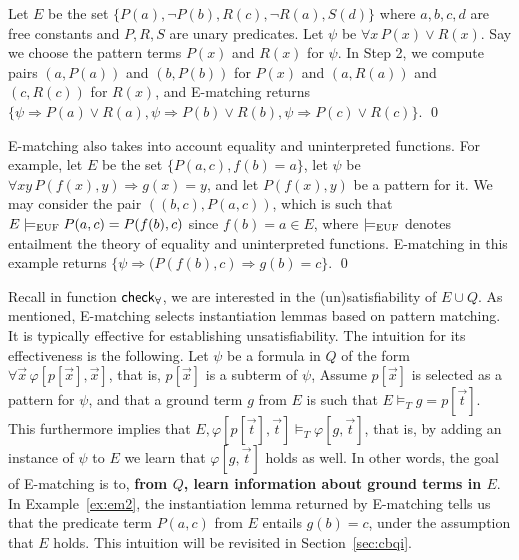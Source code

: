 \documentclass{easychair}
\begin{document}
\begin{example}
\label{ex:em2}
Let $E$ be the set $\{ P(a), \neg P(b), R(c), \neg R(a), S(d) \}$ where $a,b,c,d$ are free constants and $P,R,S$ are unary predicates.
Let $\psi$ be $\forall x\, P( x ) \vee R( x )$.
Say we choose the pattern terms $P( x )$ and $R( x )$ for $\psi$.
In Step 2, we compute pairs $( a, P( a ) )$ and $( b, P( b ) )$ for $P( x )$ and
$( a, R( a ) )$ and $( c, R( c ) )$ for $R( x )$,
and E-matching returns $\{
\psi \Rightarrow P( a ) \vee R( a ), \psi \Rightarrow P( b ) \vee R( b ), \psi \Rightarrow P( c ) \vee R( c )
\}$.
\qed
\end{example}

\begin{example}
\label{ex:em2}
E-matching also takes into account equality and uninterpreted functions.
For example, let $E$ be the set $\{ P( a, c ), f( b ) = a \}$,
let $\psi$ be $\forall xy\, P( f( x ), y ) \Rightarrow g( x ) = y$,
and let $P( f( x ), y )$ be a pattern for it.
We may consider the pair $( ( b, c ), P( a, c ) )$, which is such that $E \models_\mathrm{EUF} P( a, c ) = P( f( b ), c )$ since $f( b ) = a \in E$,
where $\models_\mathrm{EUF}$ denotes entailment the theory of equality and uninterpreted functions.
E-matching in this example returns $\{ \psi \Rightarrow ( P( f( b ), c ) \Rightarrow g( b ) = c \}$.
\qed
\end{example}

Recall in function $\small\mathsf{check}_\forall$, we are interested in the (un)satisfiability of $E \cup Q$.
As mentioned, E-matching selects instantiation lemmas based on pattern matching.
It is typically effective for establishing unsatisfiability.
The intuition for its effectiveness is the following. 
Let $\psi$ be a formula in $Q$ of the form $\forall \vec x\, \varphi[ p[ \vec x ], \vec x ]$, 
that is, $p[ \vec x ]$ is a subterm of $\psi$,
Assume $p[ \vec x ]$ is selected as a pattern for $\psi$, and
that a ground term $g$ from $E$ is such that $E \models_T g = p[ \vec t ]$.
This furthermore implies that $E, \varphi[ p[ \vec t ], \vec t ] \models_T \varphi[ g, \vec t ]$,
that is, by adding an instance of $\psi$ to $E$ we learn that $\varphi[ g, \vec t ]$ holds as well.
In other words, 
the goal of E-matching is to, {\bf from $Q$, learn information about ground terms in $E$}.
In Example~\ref{ex:em2}, the instantiation lemma returned by E-matching tells us
that the predicate term $P( a, c )$ from $E$ entails $g( b ) = c$, under the assumption that $E$ holds.
This intuition will be revisited in Section~\ref{sec:cbqi}.
\end{document}
